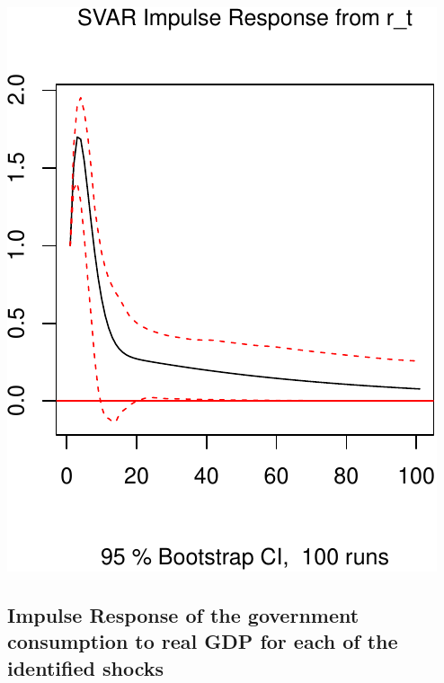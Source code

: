 \documentclass[11pt,preprint, authoryear]{elsarticle}
\numberwithin{equation}{section}
\numberwithin{figure}{section}
\numberwithin{table}{section}
\begin{document}
\includegraphics{TS_proj_files/figure-latex/unnamed-chunk-23-1.pdf}

\hypertarget{impulse-response-of-the-government-consumption-to-real-gdp-for-each-of-the-identified-shocks}{%
\subsection{Impulse Response of the government consumption to real GDP
for each of the identified
shocks}\label{impulse-response-of-the-government-consumption-to-real-gdp-for-each-of-the-identified-shocks}}
\end{document}
